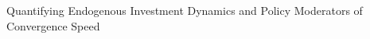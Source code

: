 \documentclass[]{article}
\begin{document}
Quantifying Endogenous Investment Dynamics and Policy Moderators of Convergence Speed
\end{document}
